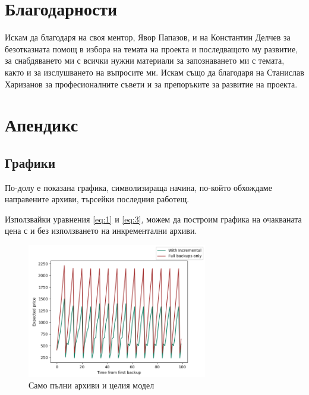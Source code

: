 \documentclass[11pt, a4paper]{article}
\theoremstyle{definition}
\begin{document}
	\section{Благодарности}
		Искам да благодаря на своя ментор, Явор Папазов, и на Константин Делчев за безотказната помощ в избора на темата на проекта и последващото му развитие, за снабдяването ми с всички нужни материали за запознаването ми с темата, както и за изслушването на въпросите ми. Искам също да благодаря на Станислав Харизанов за професионалните съвети и за препоръките за развитие на проекта.
\newpage


\section{Апендикс}
	\subsection{Графики}
		По-долу е показана графика, символизираща начина, по-който обхождаме направените архиви, търсейки последния работещ.
		\begin{center}
		\end{center}
		Използвайки уравнения \ref{eq:1} и \ref{eq:3}, можем да построим графика на очакваната цена с и без използването на инкрементални архиви.
		\begin{figure}[H]
			\begin{minipage}{1.0\textwidth}
				\centering
				\includegraphics[width=0.7\textwidth]{Weekly_full.png}
				\caption{Само пълни архиви и целия модел}\label{Fig:FullWeekly}
			\end{minipage}
		\end{figure}
\end{document}
